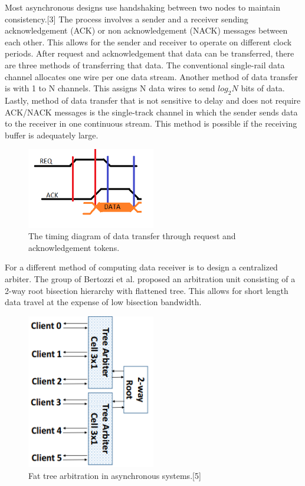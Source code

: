 \documentclass[letterpaper, 10 pt, conference]{ieeeconf}
\begin{document}
Most asynchronous designs use handshaking between two nodes to maintain consistency.[3]  The process involves a sender and a receiver sending acknowledgement (ACK) or non acknowledgement (NACK) messages between each other.  This allows for the sender and receiver to operate on different clock periods.  After request and acknowledgement that data can be transferred, there are three methods of transferring that data.  The conventional single-rail data channel allocates one wire per one data stream.  Another method of data transfer is with 1 to N channels.  This assigns N data wires to send $log_2N$ bits of data. Lastly, method of data transfer that is not sensitive to delay and does not require ACK/NACK messages is the single-track channel in which the sender sends data to the receiver in one continuous stream.  This method is possible if the receiving buffer is adequately large.

\begin{figure}[!ht] %
	\centering
	\includegraphics [width=0.5\textwidth] {Data_Transfer.png} 
    \caption{The timing diagram of data transfer through request and acknowledgement tokens.}
\end{figure}

For a different method of computing data receiver is to design a centralized arbiter.  The group of Bertozzi et al. proposed an arbitration unit consisting of a 2-way root bisection hierarchy with flattened tree.  This allows for short length data travel at the expense of low bisection bandwidth.


\begin{figure}[!ht] %
	\centering
	\includegraphics [width=0.5\textwidth] {Tree_Arbiter.PNG} 
    \caption{Fat tree arbitration in asynchronous systems.[5]}
\end{figure}
\end{document}
